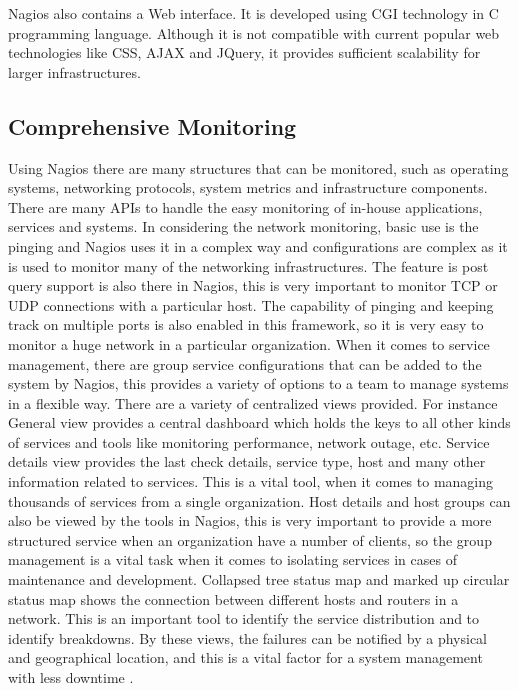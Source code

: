 \documentclass[9pt,twocolumn,twoside]{styles/osajnl}
\begin{document}
Nagios also contains a Web interface. It is developed using
CGI technology in C programming language. Although it is not 
compatible with current popular web technologies like CSS, AJAX
and JQuery, it provides sufficient scalability for larger infrastructures.


\subsection{Comprehensive Monitoring}

Using Nagios there are many structures that can be monitored, such as
operating systems, networking protocols, system metrics and
infrastructure components. There are many APIs to handle the easy
monitoring of in-house applications, services and systems. In
considering the network monitoring, basic use is the pinging and
Nagios uses it in a complex way and configurations are complex as it
is used to monitor many of the networking infrastructures. The feature
is post query support is also there in Nagios, this is very important
to monitor TCP or UDP connections with a particular host. The
capability of pinging and keeping track on multiple ports is also
enabled in this framework, so it is very easy to monitor a huge
network in a particular organization. When it comes to service
management, there are group service configurations that can be added
to the system by Nagios, this provides a variety of options to a team
to manage systems in a flexible way. There are a variety of
centralized views provided. For instance General view provides a
central dashboard which holds the keys to all other kinds of services
and tools like monitoring performance, network outage, etc.  Service
details view provides the last check details, service type, host and
many other information related to services. This is a vital tool, when
it comes to managing thousands of services from a single
organization. Host details and host groups can also be viewed by the
tools in Nagios, this is very important to provide a more structured
service when an organization have a number of clients, so the group
management is a vital task when it comes to isolating services in
cases of maintenance and development. Collapsed tree status map and
marked up circular status map shows the connection between different
hosts and routers in a network. This is an important tool to identify
the service distribution and to identify breakdowns. By these views,
the failures can be notified by a physical and geographical location,
and this is a vital factor for a system management with less downtime
\cite{info-nagios}.
\end{document}
